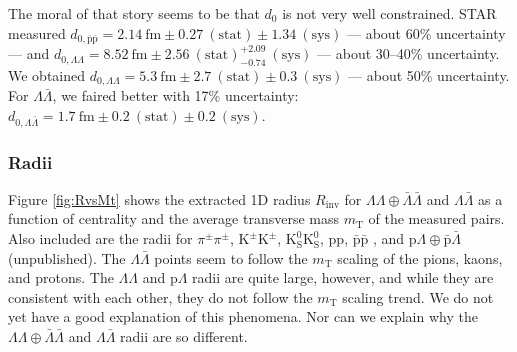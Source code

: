 The moral of that story seems to be that $d_0$ is not very well constrained. 
STAR measured $d_{0,\bar{\mathrm{p}}\bar{\mathrm{p}}} = 2.14\ \mathrm{fm} \pm 0.27\ \mathrm{(stat)} \pm 1.34\ \mathrm{(sys)}$ --- about 60\% uncertainty --- and $d_{0,\Lambda\Lambda} =  8.52\ \mathrm{fm} \pm 2.56\ \mathrm{(stat)}^{+2.09}_{-0.74}\ \mathrm{(sys)}$ --- about 30--40\% uncertainty.
We obtained $d_{0,\Lambda\Lambda} =  5.3\ \mathrm{fm} \pm 2.7\ \mathrm{(stat)} \pm 0.3\ \mathrm{(sys)}$ --- about 50\% uncertainty.
For $\Lambda\bar{\Lambda}$, we faired better with 17\% uncertainty: $d_{0,\Lambda\bar{\Lambda}} =  1.7\ \mathrm{fm} \pm 0.2\ \mathrm{(stat)} \pm 0.2\ \mathrm{(sys)}$.






\subsubsection{Radii}

Figure \ref{fig:RvsMt} shows the extracted 1D radius $R_{\mathrm{inv}}$ for $\Lambda\Lambda\oplus\bar{\Lambda}\bar{\Lambda}$ and $\Lambda\bar{\Lambda}$ as a function of centrality and the average transverse mass $m_{\mathrm{T}}$ of the measured pairs.
Also included are the radii for $\pi^\pm\pi^\pm$, $\mathrm{K^\pm}\mathrm{K^\pm}$, $\mathrm{K^0_S}\mathrm{K^0_S}$, pp, $\bar{\mathrm{p}}\bar{\mathrm{p}}$ \cite{Adam:2015vja}, and p$\Lambda\oplus\bar{\mathrm{p}}\bar{\Lambda}$ (unpublished).
The $\Lambda\bar{\Lambda}$ points seem to follow the $m_\mathrm{T}$ scaling of the pions, kaons, and protons.
The $\Lambda\Lambda$ and p$\Lambda$ radii are quite large, however, and while they are consistent with each other, they do not follow the $m_\mathrm{T}$ scaling trend.
We do not yet have a good explanation of this phenomena.
Nor can we explain why the $\Lambda\Lambda\oplus\bar{\Lambda}\bar{\Lambda}$ and $\Lambda\bar{\Lambda}$ radii are so different.


